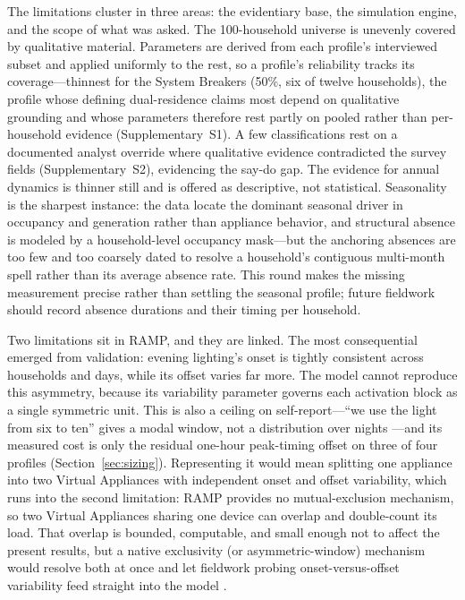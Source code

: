 \documentclass[final,3p,times,onecolumn]{elsarticle}
\begin{document}
The limitations cluster in three areas: the evidentiary base, the simulation engine, and the scope of what was asked. The 100-household universe is unevenly covered by qualitative material. Parameters are derived from each profile's interviewed subset and applied uniformly to the rest, so a profile's reliability
tracks its coverage---thinnest for the System Breakers (50\%, six of twelve households), the profile whose defining dual-residence claims most depend on qualitative grounding and whose parameters therefore rest partly on pooled rather than per-household evidence (Supplementary~S1). A few classifications rest on a documented analyst override where qualitative evidence contradicted the survey fields (Supplementary~S2), evidencing the say-do gap. The evidence for annual dynamics is thinner still and is offered as descriptive, not statistical. Seasonality is the sharpest instance: the data locate the dominant seasonal driver in occupancy and generation rather than appliance behavior, and structural absence is modeled by a household-level occupancy mask---but the anchoring absences are too few and too coarsely dated to resolve a household's contiguous multi-month spell rather than its average absence rate. This round makes the missing measurement precise rather than settling the seasonal profile; future fieldwork should record absence durations and their timing per household.

Two limitations sit in RAMP, and they are linked. The most consequential emerged from validation: evening lighting's onset is tightly consistent across households and days, while its offset varies far more. The model cannot reproduce this asymmetry, because its variability parameter governs each activation block as a
single symmetric unit. This is also a ceiling on self-report---``we use the light from six to ten'' gives a modal window, not a distribution over nights \citep{sensor-vs-survey}---and its measured cost is only the residual one-hour peak-timing offset on three of four profiles (Section~\ref{sec:sizing}). Representing it would mean splitting one appliance into two Virtual Appliances with independent onset and offset variability, which runs into the second limitation: RAMP provides no mutual-exclusion mechanism, so two Virtual Appliances sharing one device can overlap and double-count its load. That overlap is bounded, computable, and small enough not to affect the present results, but a native exclusivity (or asymmetric-window) mechanism would resolve both at once and let fieldwork probing onset-versus-offset variability feed straight into the model \citep{paper about RAMP}.
\end{document}
